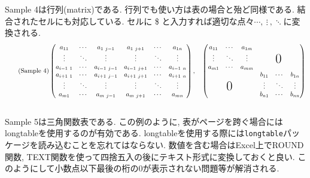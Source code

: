 \documentclass{jsarticle}
\begin{document}
Sample 4は行列(matrix)である.
行列でも使い方は表の場合と殆ど同様である.
結合されたセルにも対応している.
セルに \$ と入力すれば適切な点々$\cdots,\  \vdots\ , \ddots$に変換される.
\begin{align}
	\tag{Sample 4}
	\begin{pmatrix}
		a_{11}	&\cdots	&a_{1\ j-1}	&a_{1\ j+1}	&\cdots	&a_{1n}	\\
		\vdots	&\ddots	&\vdots	&\vdots	&\ddots	&\vdots	\\
		a_{i-1\ 1}	&\cdots	&a_{i-1\ j-1}	&a_{i-1\ j+1}	&\cdots	&a_{i-1\ n}	\\
		a_{i+1\ 1}	&\cdots	&a_{i+1\ j-1}	&a_{i+1\ j+1}	&\cdots	&a_{i+1\ n}	\\
		\vdots	&\ddots	&\vdots	&\vdots	&\ddots	&\vdots	\\
		a_{m1}	&\cdots	&a_{m\ j-1}	&a_{m\ j+1}	&\cdots	&a_{mn}
	\end{pmatrix}, \quad
	\begin{pmatrix}
		a_{11}	&\cdots	&a_{1m}	&\multicolumn{3}{c}{\multirow{3}{*}{$\hspace{-0.4em}\raisebox{-1.5em}{\text{\huge0}}$}}	\\
		\vdots	&\ddots	&\vdots	&\multicolumn{3}{c}{}	\\
		a_{m1}	&\cdots	&a_{mm}	&\multicolumn{3}{c}{}	\\
		\multicolumn{3}{c}{\multirow{3}{*}{$\hspace{-0.4em}\raisebox{-1.5em}{\text{\huge0}}$}}	&b_{11}	&\cdots	&b_{1n}	\\
		\multicolumn{3}{c}{}	&\vdots	&\ddots	&\vdots	\\
		\multicolumn{3}{c}{}	&b_{n1}	&\cdots	&b_{nn}
	\end{pmatrix}
\end{align}
\\

Sample 5は三角関数表である.
この例のように, 表がページを跨ぐ場合にはlongtableを使用するのが有効である.
longtableを使用する際には\verb|longtable|パッケージを読み込むことを忘れてはならない.
数値を含む場合はExcel上でROUND関数, TEXT関数を使って四捨五入の後にテキスト形式に変換しておくと良い.
このようにして小数点以下最後の桁の$0$が表示されない問題等が解消される.
\end{document}
